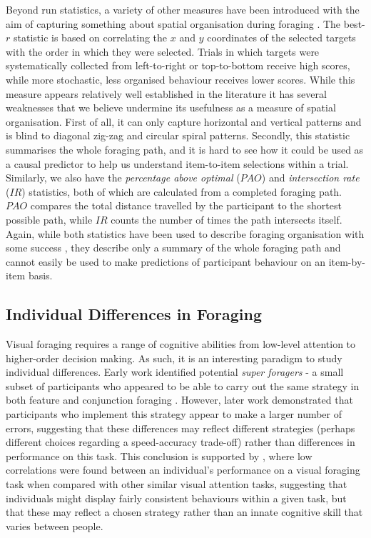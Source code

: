 \documentclass[man, floatsintext]{apa7}
\begin{document}
Beyond run statistics, a variety of other measures have been introduced with the aim of capturing something about spatial organisation during foraging \citep{bella2024}. The best-$r$ statistic is based on correlating the $x$ and $y$ coordinates of the selected targets with the order in which they were selected. Trials in which targets were systematically collected from left-to-right or top-to-bottom receive high scores, while more stochastic, less organised behaviour receives lower scores. While this measure appears relatively well established in the literature \citep{woods2013development, olafsdottir2021, johannesson2016visual} it has several weaknesses that we believe undermine its usefulness as a measure of spatial organisation. First of all, it can only capture horizontal and vertical patterns and is blind to diagonal zig-zag and circular spiral patterns. Secondly, this statistic summarises the whole foraging path, and it is hard to see how it could be used as a causal predictor to help us understand item-to-item selections within a trial. Similarly, we also have the \textit{percentage above optimal} ($PAO$) and \textit{intersection rate} ($IR$) statistics, both of which are calculated from a completed foraging path. $PAO$ compares the total distance travelled by the participant to the shortest possible path, while $IR$ counts the number of times the path intersects itself. Again, while both statistics have been used to describe foraging organisation with some success \citep{olafsdottir2021, wiener2007path}, they describe only a summary of the whole foraging path and cannot easily be used to make predictions of participant behaviour on an item-by-item basis.

\subsection{Individual Differences in Foraging}

Visual foraging requires a range of cognitive abilities from low-level attention to higher-order decision making. As such, it is an interesting paradigm to study individual differences. Early work identified potential \textit{super foragers} - a small subset of participants who appeared to be able to carry out the same strategy in both feature and conjunction foraging \cite{kristjansson2014}. However, later work \citep{tagu2020} demonstrated that participants who implement this strategy appear to make a larger number of errors, suggesting that these differences may reflect different strategies (perhaps different choices regarding a speed-accuracy trade-off) rather than differences in performance on this task. This conclusion is supported by \citep{clarke2022qjep}, where low correlations were found between an individual's performance on a visual foraging task when compared with other similar visual attention tasks, suggesting that individuals might display fairly consistent behaviours within a given task, but that these may reflect a chosen strategy rather than an innate cognitive skill that varies between people.
\end{document}
